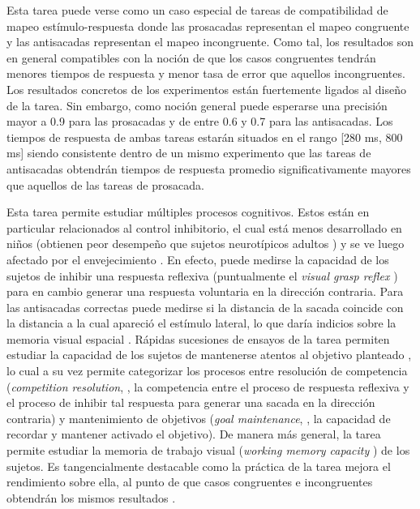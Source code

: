 Esta tarea puede verse como un caso especial de tareas de compatibilidad de
mapeo estímulo-respuesta \cite{munoz_2004_look_away} donde las prosacadas
representan el mapeo congruente y las antisacadas representan el mapeo
incongruente.
Como tal, los resultados son en general compatibles con la noción de que los
casos congruentes tendrán menores tiempos de respuesta y menor tasa de error
que aquellos incongruentes.
Los resultados concretos de los experimentos están fuertemente ligados al
diseño de la tarea.
Sin embargo, como noción general puede esperarse una precisión mayor a 0.9 para
las prosacadas y de entre 0.6 y 0.7 para las antisacadas.
Los tiempos de respuesta de ambas tareas estarán situados en el rango [280 ms,
800 ms] siendo consistente dentro de un mismo experimento que las tareas de
antisacadas obtendrán tiempos de respuesta promedio significativamente mayores
que aquellos de las tareas de prosacada.

Esta tarea permite estudiar múltiples procesos cognitivos.
Estos están en particular relacionados al control inhibitorio, el cual está
menos desarrollado en niños (obtienen peor desempeño que sujetos neurotípicos
adultos \cite{munoz_2004_look_away, smyrnis_2002_big_sample}) y se ve luego
afectado por el envejecimiento \cite{olincy_1997_age_diminishes_performance}.
En efecto, puede medirse la capacidad de los sujetos de inhibir una respuesta
reflexiva (puntualmente el \textit{visual grasp reflex}
\cite{munoz_2004_look_away}) para en cambio generar una respuesta voluntaria
en la dirección contraria.
Para las antisacadas correctas puede medirse si la distancia de la sacada
coincide con la distancia a la cual apareció el estímulo lateral, lo que daría
indicios sobre la memoria visual espacial
\cite{olincy_1997_age_diminishes_performance}.
Rápidas sucesiones de ensayos de la tarea permiten estudiar la capacidad
de los sujetos de mantenerse atentos al objetivo planteado
\cite{olincy_1997_age_diminishes_performance}, lo cual a su vez permite
categorizar los procesos entre resolución de competencia (\textit{competition resolution}, \ie, la
competencia entre el proceso de respuesta reflexiva y el proceso de inhibir tal
respuesta para generar una sacada en la dirección contraria) y mantenimiento de objetivos (\textit{goal
maintenance}, \ie, la capacidad de recordar y mantener activado el objetivo).
De manera más general, la tarea permite estudiar la memoria de trabajo visual (\textit{working memory
capacity} \cite{unsworth_2011_distribution_analysis,
unsworth_2021_working_memory_capacity}) de los sujetos.
Es tangencialmente destacable como la práctica de la tarea mejora el rendimiento
sobre ella, al punto de que casos congruentes e incongruentes obtendrán los
mismos resultados \cite{unsworth_2011_distribution_analysis}.

